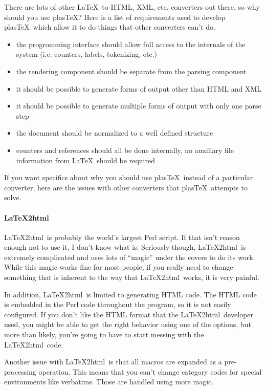 \documentclass{manual}
\newcommand{\LaTeXtohtml}{{\LaTeX}2html}
\newcommand{\plasTeX}{plas\TeX}
\begin{document}
There are lots of other \LaTeX\ to HTML, XML, etc. converters out there,
so why should you use \plasTeX?  Here is a list of requirements used to
develop \plasTeX\ which allow it to do things that other converters
can't do.

\begin{itemize}
\item the progromming interface should allow full access to the internals
    of the system (i.e. counters, labels, tokenizing, etc.)
\item the rendering component should be separate from the parsing component
\item it should be possible to generate forms of output other than HTML and XML
\item it should be possible to generate multiple forms of output with
    only one parse step
\item the document should be normalized to a well defined structure
\item counters and references should all be done internally, no auxiliary
    file information from \LaTeX\ should be required
\end{itemize}

If you want specifics about why you should use \plasTeX\ instead of
a particular converter, here are the issues with other converters that
\plasTeX\ attempts to solve.

\paragraph{\LaTeXtohtml}
\LaTeXtohtml\ is probably the world's largest Perl script.  If that isn't
reason enough not to use it, I don't know what is.  Seriously though, 
\LaTeXtohtml\ is extremely complicated and uses lots of ``magic'' under
the covers to do its work.  While this magic works fine for most people,
if you really need to change something that is inherent to the way that
\LaTeXtohtml\ works, it is very painful.  

In addition, \LaTeXtohtml\ is limited to generating HTML code.  The HTML
code is embedded in the Perl code throughout the program, so it is not 
easily configured.  If you don't like the HTML format that the 
\LaTeXtohtml\ developer used, you might be able to get the right behavior
using one of the options, but more than likely, you're going to have to
start messing with the \LaTeXtohtml\ code.  

Another issue with \LaTeXtohtml\ is that all macros are expanded as a 
pre-processing operation.  This means that you can't change category 
codes for special environments like verbatims.  Those are handled using
more magic.
\end{document}
